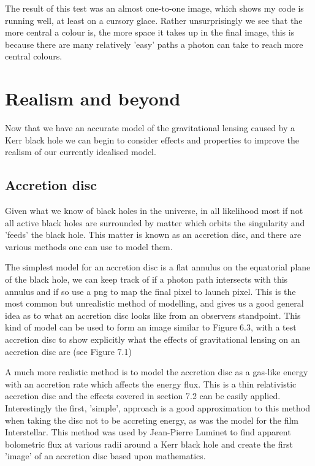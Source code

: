 \documentclass[oneside,openright,frontopenright, singlespacing]{dmathesis}
\begin{document}
\vspace{1em}
	The result of this test was an almost one-to-one image, which shows my code is running well, at least on a cursory glace. Rather unsurprisingly we see that the more central a colour is, the more space it takes up in the final image, this is because there are many relatively 'easy' paths a photon can take to reach more central colours.

\chapter{Realism and beyond}

	Now that we have an accurate model of the gravitational lensing caused by a Kerr black hole we can begin to consider effects and properties to improve the realism of our currently idealised model.

\section{Accretion disc}

	Given what we know of black holes in the universe, in all likelihood most if not all active black holes are surrounded by matter which orbits the singularity and 'feeds' the black hole. This matter is known as an accretion disc, and there are various methods one can use to model them.

\vspace{1em}
	The simplest model for an accretion disc is a flat annulus on the equatorial plane of the black hole, we can keep track of if a photon path intersects with this annulus and if so use a png to map the final pixel to launch pixel. This is the most common but unrealistic method of modelling, and gives us a good general idea as to what an accretion disc looks like from an observers standpoint. This kind of model can be used to form an image similar to Figure 6.3, with a test accretion disc to show explicitly what the effects of gravitational lensing on an accretion disc are (see Figure 7.1)

\vspace{1em}
	A much more realistic method is to model the accretion disc as a gas-like energy with an accretion rate which affects the energy flux. This is a thin relativistic accretion disc and the effects covered in section 7.2 can be easily applied. Interestingly the first, 'simple', approach is a good approximation to this method when taking the disc not to be accreting energy, as was the model for the film Interstellar. This method was used by Jean-Pierre Luminet to find apparent bolometric flux at various radii around a Kerr black hole and create the first 'image' of an accretion disc based upon mathematics.
\end{document}
